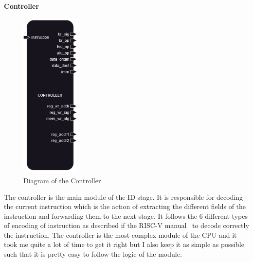 \paragraph{Controller}

\begin{figure}[H]
    \centering
    \includegraphics[width=0.26\textwidth]{design/pipelined/decode/images/controller.png}
    \caption{Diagram of the Controller}
    \label{fig:controller}
\end{figure}

The controller is the main module of the ID stage. It is responsible for decoding the current instruction which is the action
of extracting the different fields of the instruction and forwarding them to the next stage. It follows the 6 different
types of encoding of instruction as described if the RISC-V manual~\cite{riscv_manual} to decode correctly the instruction.
The controller is the most complex module of the CPU and it took me quite a lot of time to get it right but I also
keep it as simple as possible such that it is pretty easy to follow the logic of the module. \\

